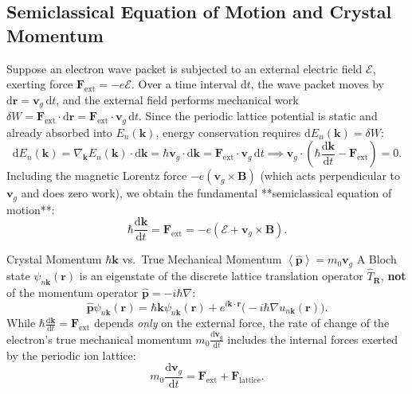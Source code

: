 \documentclass[11pt,a4paper]{article}
\newcommand{\expect}[1]{\left\langle #1 \right\rangle}
\newcommand{\dv}[2]{\frac{\mathrm{d}#1}{\mathrm{d}#2}}
\newcommand{\vb}[1]{\mathbf{#1}}
\newcommand{\hb}{\hbar}
\newcommand{\dd}{\mathrm{d}}
\newcommand{\kk}{\mathbf{k}}
\newcommand{\RR}{\mathbf{R}}
\newcommand{\rvec}{\mathbf{r}}
\begin{document}
\subsection{Semiclassical Equation of Motion and Crystal Momentum}
Suppose an electron wave packet is subjected to an external electric field $\bm{\mathcal{E}}$, exerting force $\vb{F}_{\mathrm{ext}} = -e\bm{\mathcal{E}}$. Over a time interval $\dd t$, the wave packet moves by $\dd\rvec = \vb{v}_g\,\dd t$, and the external field performs mechanical work $\delta W = \vb{F}_{\mathrm{ext}}\cdot\dd\rvec = \vb{F}_{\mathrm{ext}}\cdot\vb{v}_g\,\dd t$. Since the periodic lattice potential is static and already absorbed into $E_n(\kk)$, energy conservation requires $\dd E_n(\kk) = \delta W$:
\begin{equation}
    \dd E_n(\kk) = \nabla_{\kk}E_n(\kk)\cdot\dd\kk = \hb\vb{v}_g\cdot\dd\kk = \vb{F}_{\mathrm{ext}}\cdot\vb{v}_g\,\dd t \implies \vb{v}_g\cdot\left(\hb\dv{\kk}{t} - \vb{F}_{\mathrm{ext}}\right) = 0.
\end{equation}
Including the magnetic Lorentz force $-e(\vb{v}_g\times\vb{B})$ (which acts perpendicular to $\vb{v}_g$ and does zero work), we obtain the fundamental **semiclassical equation of motion**:
\begin{equation}
    \boxed{\hb\dv{\kk}{t} = \vb{F}_{\mathrm{ext}} = -e\left(\bm{\mathcal{E}} + \vb{v}_g\times\vb{B}\right).}
    \label{eq:semiclassical_eom_master}
\end{equation}

\begin{pitfallbox}{Crystal Momentum $\hb\kk$ vs.\ True Mechanical Momentum $\expect{\hat{\vb{p}}} = m_0\vb{v}_g$}
A Bloch state $\psi_{n\kk}(\rvec)$ is an eigenstate of the discrete lattice translation operator $\hat{T}_{\RR}$, \textbf{not} of the momentum operator $\hat{\vb{p}} = -i\hb\nabla$:
\begin{equation}
    \hat{\vb{p}}\psi_{n\kk}(\rvec) = \hb\kk\psi_{n\kk}(\rvec) + e^{i\kk\cdot\rvec}\big(-i\hb\nabla u_{n\kk}(\rvec)\big).
\end{equation}
While $\hb\dv{\kk}{t} = \vb{F}_{\mathrm{ext}}$ depends \emph{only} on the external force, the rate of change of the electron's true mechanical momentum $m_0\dv{\vb{v}_g}{t}$ includes the internal forces exerted by the periodic ion lattice:
\begin{equation}
    m_0\dv{\vb{v}_g}{t} = \vb{F}_{\mathrm{ext}} + \vb{F}_{\mathrm{lattice}}.
\end{equation}
\end{pitfallbox}
\end{document}

